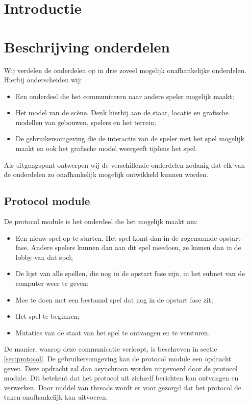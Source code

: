 \documentclass[a4paper,11pt]{article}
\newcommand{\protoref}{sectie \ref{sec:protocol}}
\begin{document}
	
	
	\tableofcontents
	\newpage

	\section{Introductie}
	
	\newpage

    \section{Beschrijving onderdelen}
    Wij verdelen de onderdelen op in drie zoveel mogelijk onafhankelijke onderdelen. Hierbij onderscheiden wij:
    \begin{itemize}
    \item Een onderdeel die het communiceren naar andere speler mogelijk maakt;
	\item Het model van de sc\`ene. Denk hierbij aan de staat, locatie en grafische modellen van gebouwen, spelers en het terrein;
	\item De gebruikersomgeving die de interactie van de speler met het spel mogelijk maakt en ook het grafische model weergeeft tijdens het spel.
    \end{itemize}

    Als uitgangspunt ontwerpen wij de verschillende onderdelen zodanig dat elk van de onderdelen zo onafhankelijk mogelijk ontwikkeld kunnen worden.
    	
    \subsection{Protocol module}
    De protocol module is het onderdeel die het mogelijk maakt om:
	\begin{itemize}
	\item Een nieuw spel op te starten. Het spel komt dan in de zogenaamde opstart fase. Andere spelers kunnen dan aan dit spel meedoen, ze komen dan in de lobby van dat spel;
	\item De lijst van alle spellen, die nog in de opstart fase zijn, in het subnet van de computer weer te geven;
	\item Mee te doen met een bestaand spel dat nog in de opstart fase zit;
	\item Het spel te beginnen;
	\item Mutaties van de staat van het spel te ontvangen en te versturen.
	\end{itemize}
	De manier, waarop deze communicatie verloopt, is beschreven in \protoref. De gebruikersomgeving kan de protocol module een opdracht geven. Deze opdracht zal dan asynchroon worden uitgevoerd door de protocol module. Dit betekent dat het protocol uit zichzelf berichten kan ontvangen en verwerken. Door middel van threads wordt er voor gezorgd dat het protocol de taken onafhankelijk kan uitvoeren.
	
\end{document}
